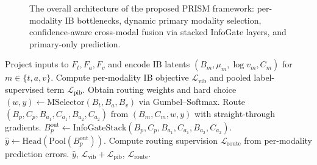 \begin{figure}[t]
  \centering
  \caption{The overall architecture of the proposed PRISM framework:
    per-modality IB bottlenecks, dynamic primary modality selection,
    confidence-aware cross-modal fusion via stacked InfoGate layers, and
    primary-only prediction.}
  \label{fig:arch}
\end{figure}

\begin{algorithm}[t]
  \caption{PRISM forward pass on a single batch.}
  \label{alg:forward}
  \begin{algorithmic}[1]
    \STATE Project inputs to $F_t,F_a,F_v$ and encode IB latents
      $(B_m,\mu_m,\log v_m,C_m)$ for $m\in\{t,a,v\}$.
    \STATE Compute per-modality IB objective
      $\mathcal{L}_{\mathrm{vib}}$ and pooled label-supervised term
      $\mathcal{L}_{\mathrm{pib}}$.
    \STATE Obtain routing weights and hard choice
      $(w,y)\leftarrow \mathrm{MSelector}(B_t,B_a,B_v)$ via Gumbel--Softmax.
    \STATE Route $(B_p,C_p,B_{a_1},C_{a_1},B_{a_2},C_{a_2})$ from
      $(B_m,C_m,w,y)$ with straight-through gradients.
    \STATE $B_p^{\mathrm{out}} \leftarrow
      \mathrm{InfoGateStack}(B_p,C_p,B_{a_1},C_{a_1},B_{a_2},C_{a_2})$.
    \STATE $\hat{y} \leftarrow \mathrm{Head}(\mathrm{Pool}(B_p^{\mathrm{out}}))$.
      \STATE Compute routing supervision
        $\mathcal{L}_{\mathrm{route}}$ from per-modality prediction errors.
    \ENDIF
    \RETURN $\hat{y}$,
      $\mathcal{L}_{\mathrm{vib}}+\mathcal{L}_{\mathrm{pib}}$,
      $\mathcal{L}_{\mathrm{route}}$.
  \end{algorithmic}
\end{algorithm}

